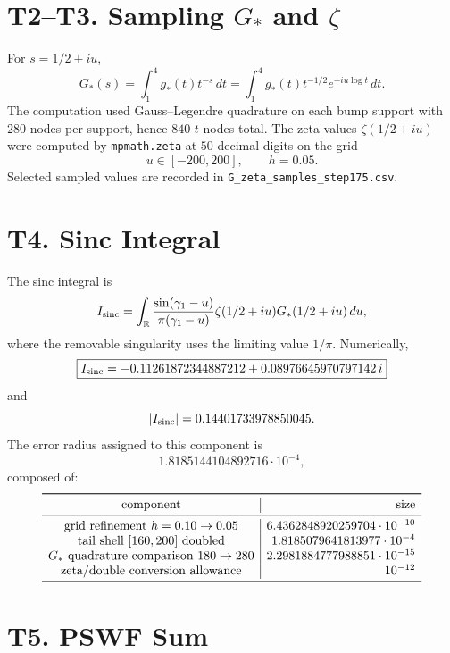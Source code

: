 \documentclass[11pt]{article}
\begin{document}
\section{T2--T3. Sampling \(G_*\) and \(\zeta\)}

For \(s=1/2+iu\),
\[
G_*(s)=\int_1^4 g_*(t)t^{-s}\,dt
=\int_1^4 g_*(t)t^{-1/2}e^{-iu\log t}\,dt.
\]
The computation used Gauss--Legendre quadrature on each bump support with
\(280\) nodes per support, hence \(840\) \(t\)-nodes total.  The zeta values
\(\zeta(1/2+iu)\) were computed by \texttt{mpmath.zeta} at \(50\) decimal
digits on the grid
\[
u\in[-200,200],\qquad h=0.05.
\]
Selected sampled values are recorded in
\texttt{G\_zeta\_samples\_step175.csv}.

\section{T4. Sinc Integral}

The sinc integral is
\[
I_{\rm sinc}
=\int_{\mathbb R}
\frac{\sin(\gamma_1-u)}{\pi(\gamma_1-u)}
\zeta(1/2+iu)G_*(1/2+iu)\,du,
\]
where the removable singularity uses the limiting value \(1/\pi\).
Numerically,
\[
\boxed{
I_{\rm sinc}
=-0.11261872344887212
+0.08976645970797142\,i
}
\]
and
\[
|I_{\rm sinc}|=0.14401733978850045.
\]
The error radius assigned to this component is
\[
1.8185144104892716\cdot10^{-4},
\]
composed of:
\[
\begin{array}{c|r}
\toprule
\text{component} & \text{size}\\
\midrule
\text{grid refinement } h=0.10\to0.05 & 6.4362848920259704\cdot10^{-10}\\
\text{tail shell } [160,200] \text{ doubled} & 1.8185079641813977\cdot10^{-4}\\
\text{\(G_*\) quadrature comparison } 180\to280 & 2.2981884777988851\cdot10^{-15}\\
\text{zeta/double conversion allowance} & 10^{-12}\\
\bottomrule
\end{array}
\]

\section{T5. PSWF Sum}
\end{document}
